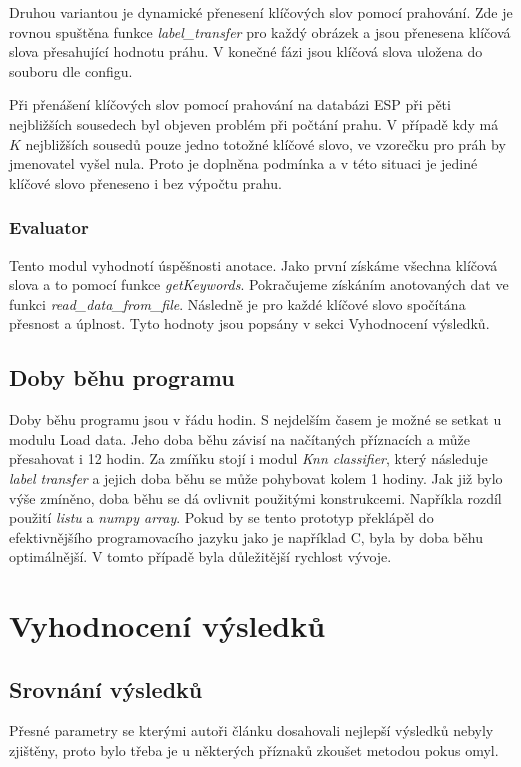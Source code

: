 \documentclass[czech,BP]{thesiskiv}
\begin{document}
\par Druhou variantou je dynamické přenesení klíčových slov pomocí prahování. Zde je rovnou spuštěna funkce \textit{label\_transfer} pro každý obrázek a jsou přenesena klíčová slova přesahující hodnotu práhu. V konečné fázi jsou klíčová slova uložena do souboru dle configu. 

\par Při přenášení klíčových slov pomocí prahování na databázi ESP při pěti nejbližších sousedech byl objeven problém při počtání prahu. V případě kdy má $K$ nejbližších sousedů pouze jedno totožné klíčové slovo, ve vzorečku pro práh by jmenovatel vyšel nula. Proto je doplněna podmínka a v této situaci je jediné klíčové slovo přeneseno i bez výpočtu prahu. 
  

\subsection{Evaluator}
\par Tento modul vyhodnotí úspěšnosti anotace. Jako první získáme všechna klíčová slova a to pomocí funkce \textit{getKeywords}. Pokračujeme získáním anotovaných dat ve funkci \textit{read\_data\_from\_file}.  Následně je pro každé klíčové slovo spočítána přesnost a úplnost. Tyto hodnoty jsou popsány v sekci Vyhodnocení výsledků.

\section{Doby běhu programu}
\par Doby běhu programu jsou v řádu hodin. S nejdelším časem je možné se setkat u modulu Load data. Jeho doba běhu závisí na načítaných příznacích a může přesahovat i 12 hodin. Za zmíňku stojí i modul \textit{Knn classifier}, který následuje \textit{label transfer} a jejich doba běhu se může pohybovat kolem 1 hodiny. Jak již bylo výše zmíněno, doba běhu se dá ovlivnit použitými konstrukcemi. Napříkla rozdíl použití \textit{listu} a \textit{numpy array}.
Pokud by se tento prototyp překlápěl do efektivnějšího programovacího jazyku jako je například C, byla by doba běhu optimálnější. V tomto případě byla důležitější rychlost vývoje.

\chapter{Vyhodnocení výsledků}

\section{Srovnání výsledků}
Přesné parametry se kterými autoři článku \cite{JEC2} dosahovali nejlepší výsledků nebyly zjištěny, proto bylo třeba je u některých příznaků zkoušet metodou pokus omyl. 
\end{document}
